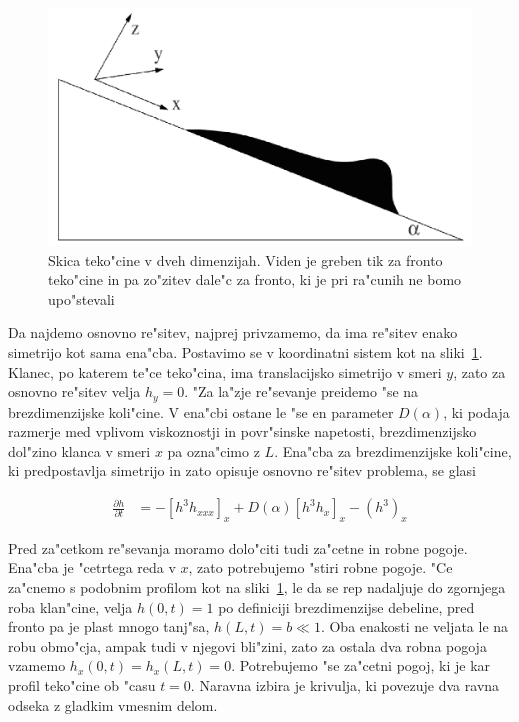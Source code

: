 \documentclass[a4paper,10pt]{article}
\newcommand{\odv}[1]{\frac{\partial #1}{\partial t}}
\begin{document}
\begin{figure}[h]
\centering
 \includegraphics[width=.8\textwidth]{./Slike/film-skica}
\caption{Skica teko"cine v dveh dimenzijah. Viden je greben tik za fronto teko"cine in pa zo"zitev dale"c za fronto, ki je pri ra"cunih ne bomo upo"stevali}
\label{fig:film-skica}
\end{figure}

Da najdemo osnovno re"sitev, najprej privzamemo, da ima re"sitev enako simetrijo kot sama ena"cba. Postavimo se v koordinatni sistem kot na sliki~\ref{fig:film-skica}. Klanec, po katerem te"ce teko"cina, ima translacijsko simetrijo v smeri $y$, zato za osnovno re"sitev velja $h_y = 0$. "Za la"zje re"sevanje preidemo "se na brezdimenzijske koli"cine. V ena"cbi ostane le "se en parameter $D(\alpha)$, ki podaja razmerje med vplivom viskoznostji in povr"sinske napetosti, brezdimenzijsko dol"zino klanca v smeri $x$ pa ozna"cimo z $L$. Ena"cba za brezdimenzijske koli"cine, ki predpostavlja simetrijo in zato opisuje osnovno re"sitev problema, se glasi


\begin{align}
  \label{eq:ns-film-sim}
 \odv{h} &= - \left[h^3 h_{xxx}\right]_x + D(\alpha) \left[h^3 h_x\right]_x - \left(h^3\right)_x
\end{align}

Pred za"cetkom re"sevanja moramo dolo"citi tudi za"cetne in robne pogoje. Ena"cba je "cetrtega reda v $x$, zato potrebujemo "stiri robne pogoje. "Ce za"cnemo s podobnim profilom kot na sliki~\ref{fig:film-skica}, le da se rep nadaljuje do zgornjega roba klan"cine, velja $h(0, t) = 1$ po definiciji brezdimenzijse debeline, pred fronto pa je plast mnogo tanj"sa, $h(L, t) = b \ll 1$. Oba enakosti ne veljata le na robu obmo"cja, ampak tudi v njegovi bli"zini, zato za ostala dva robna pogoja vzamemo $h_x(0,t) = h_x(L,t) = 0$. Potrebujemo "se za"cetni pogoj, ki je kar profil teko"cine ob "casu $t=0$. Naravna izbira je krivulja, ki povezuje dva ravna odseka z gladkim vmesnim delom. 
\end{document}
